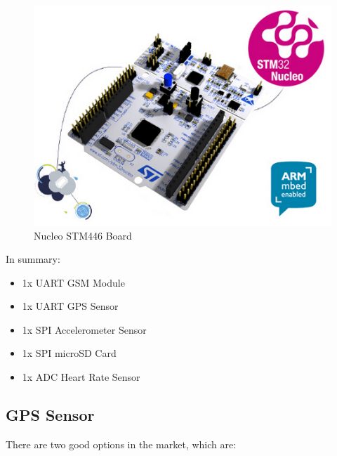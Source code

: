 \documentclass[10pt,journal,compsoc]{IEEEtran}
\begin{document}
\begin{figure}[h]
  \centering
  \captionsetup{justification=centering}
  \includegraphics[scale=.45]{es4}
  \caption{Nucleo STM446 Board}
  \label{fig:fig5}
\end{figure}

\hfil

In summary:

\begin{itemize}
  \item 1x UART GSM Module
  \item 1x UART GPS Sensor
  \item 1x SPI Accelerometer Sensor
  \item 1x SPI microSD Card
  \item 1x ADC Heart Rate Sensor
\end{itemize}

\hfil

\subsection{GPS Sensor}

There are two good options in the market, which are:
\end{document}
